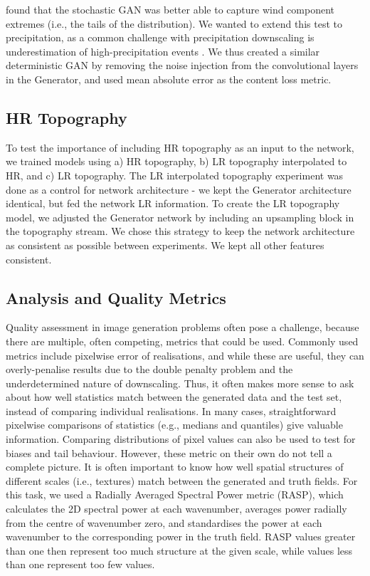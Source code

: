\documentclass{ametsocV6.1}
\begin{document}
\citet{daust2024capturing} found that the stochastic GAN was better able to capture wind component extremes (i.e., the tails of the distribution). We wanted to extend this test to precipitation, as a common challenge with precipitation downscaling is underestimation of high-precipitation events \citep{kumar2023modern}. We thus created a similar deterministic GAN by removing the noise injection from the convolutional layers in the Generator, and used mean absolute error as the content loss metric. 

\subsection{HR Topography}
To test the importance of including HR topography as an input to the network, we trained models using a) HR topography, b) LR topography interpolated to HR, and c) LR topography. The LR interpolated topography experiment was done as a control for network architecture - we kept the Generator architecture identical, but fed the network LR information. To create the LR topography model, we adjusted the Generator network by including an upsampling block in the topography stream. We chose this strategy to keep the network architecture as consistent as possible between experiments. We kept all other features consistent. 

\subsection{Analysis and Quality Metrics}
Quality assessment in image generation problems often pose a challenge, because there are multiple, often competing, metrics that could be used. Commonly used metrics include pixelwise error of realisations, and while these are useful, they can overly-penalise results due to the double penalty problem and the underdetermined nature of downscaling. Thus, it often makes more sense to ask about how well statistics match between the generated data and the test set, instead of comparing individual realisations. In many cases, straightforward pixelwise comparisons of statistics (e.g., medians and quantiles) give valuable information. Comparing distributions of pixel values can also be used to test for biases and tail behaviour. However, these metric on their own do not tell a complete picture. It is often important to know how well spatial structures of different scales (i.e., textures) match between the generated and truth fields. For this task, we used a Radially Averaged Spectral Power metric (RASP), which calculates the 2D spectral power at each wavenumber, averages power radially from the centre of wavenumber zero, and standardises the power at each wavenumber to the corresponding power in the truth field. RASP values greater than one then represent too much structure at the given scale, while values less than one represent too few values.
\end{document}
